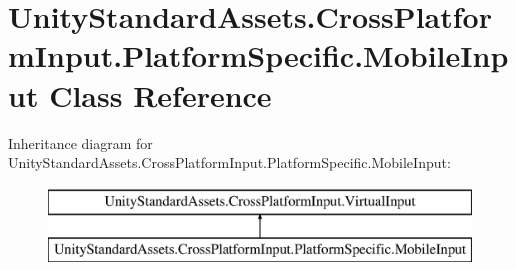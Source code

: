 \hypertarget{class_unity_standard_assets_1_1_cross_platform_input_1_1_platform_specific_1_1_mobile_input}{}\section{Unity\+Standard\+Assets.\+Cross\+Platform\+Input.\+Platform\+Specific.\+Mobile\+Input Class Reference}
\label{class_unity_standard_assets_1_1_cross_platform_input_1_1_platform_specific_1_1_mobile_input}
Inheritance diagram for Unity\+Standard\+Assets.\+Cross\+Platform\+Input.\+Platform\+Specific.\+Mobile\+Input\+:\begin{figure}[H]
\begin{center}
\leavevmode
\includegraphics[height=2.000000cm]{class_unity_standard_assets_1_1_cross_platform_input_1_1_platform_specific_1_1_mobile_input}
\end{center}
\end{figure}
